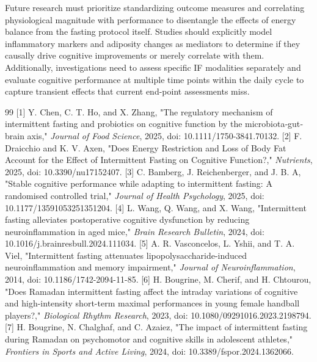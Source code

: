 \documentclass[conference]{IEEEtran}
\begin{document}
Future research must prioritize standardizing outcome measures and correlating physiological magnitude with performance to disentangle the effects of energy balance from the fasting protocol itself. Studies should explicitly model inflammatory markers and adiposity changes as mediators to determine if they causally drive cognitive improvements or merely correlate with them. Additionally, investigations need to assess specific IF modalities separately and evaluate cognitive performance at multiple time points within the daily cycle to capture transient effects that current end-point assessments miss.

\begin{thebibliography}{99}
 [1] Y. Chen, C. T. Ho, and X. Zhang, "The regulatory mechanism of intermittent fasting and probiotics on cognitive function by the microbiota‐gut‐brain axis," \textit{Journal of Food Science}, 2025, doi: 10.1111/1750-3841.70132.
 [2] F. Draicchio and K. V. Axen, "Does Energy Restriction and Loss of Body Fat Account for the Effect of Intermittent Fasting on Cognitive Function?," \textit{Nutrients}, 2025, doi: 10.3390/nu17152407.
 [3] C. Bamberg, J. Reichenberger, and J. B. A, "Stable cognitive performance while adapting to intermittent fasting: A randomised controlled trial," \textit{Journal of Health Psychology}, 2025, doi: 10.1177/13591053251351204.
 [4] L. Wang, Q. Wang, and X. Wang, "Intermittent fasting alleviates postoperative cognitive dysfunction by reducing neuroinflammation in aged mice," \textit{Brain Research Bulletin}, 2024, doi: 10.1016/j.brainresbull.2024.111034.
 [5] A. R. Vasconcelos, L. Yshii, and T. A. Viel, "Intermittent fasting attenuates lipopolysaccharide-induced neuroinflammation and memory impairment," \textit{Journal of Neuroinflammation}, 2014, doi: 10.1186/1742-2094-11-85.
 [6] H. Bougrine, M. Cherif, and H. Chtourou, "Does Ramadan intermittent fasting affect the intraday variations of cognitive and high-intensity short-term maximal performances in young female handball players?," \textit{Biological Rhythm Research}, 2023, doi: 10.1080/09291016.2023.2198794.
 [7] H. Bougrine, N. Chalghaf, and C. Azaiez, "The impact of intermittent fasting during Ramadan on psychomotor and cognitive skills in adolescent athletes," \textit{Frontiers in Sports and Active Living}, 2024, doi: 10.3389/fspor.2024.1362066.
\end{thebibliography}
\end{document}
